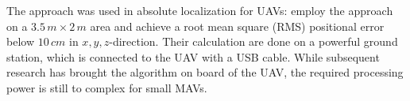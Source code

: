 The approach was used in absolute localization for UAVs: \citet{blosch2010vision} employ the approach on a $3.5\,m \times 2\,m$ area and achieve a root mean square (RMS) positional error below $10\,cm$ in $x,y,z$-direction. Their calculation are done on a powerful ground station, which is connected to the UAV with a USB cable. While subsequent research has brought the algorithm on board of the UAV, the required processing power is still to complex for small MAVs.  